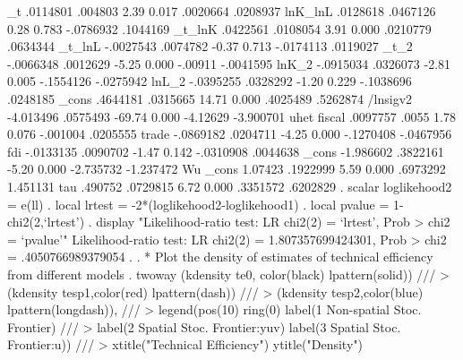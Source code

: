           _t {\VBAR}   .0114801    .004803     2.39   0.017     .0020664    .0208937
     lnK_lnL {\VBAR}   .0128618   .0467126     0.28   0.783    -.0786932    .1044169
      _t_lnK {\VBAR}   .0422561   .0108054     3.91   0.000     .0210779    .0634344
      _t_lnL {\VBAR}  -.0027543   .0074782    -0.37   0.713    -.0174113    .0119027
        _t_2 {\VBAR}  -.0066348   .0012629    -5.25   0.000      -.00911   -.0041595
       lnK_2 {\VBAR}  -.0915034   .0326073    -2.81   0.005    -.1554126   -.0275942
       lnL_2 {\VBAR}  -.0395255   .0328292    -1.20   0.229    -.1038696    .0248185
       _cons {\VBAR}   .4644181   .0315665    14.71   0.000     .4025489    .5262874
    /lnsigv2 {\VBAR}  -4.013496   .0575493   -69.74   0.000     -4.12629   -3.900701
uhet         {\VBAR}
      fiscal {\VBAR}   .0097757      .0055     1.78   0.076     -.001004    .0205555
       trade {\VBAR}  -.0869182   .0204711    -4.25   0.000    -.1270408   -.0467956
         fdi {\VBAR}  -.0133135   .0090702    -1.47   0.142    -.0310908    .0044638
       _cons {\VBAR}  -1.986602   .3822161    -5.20   0.000    -2.735732   -1.237472
Wu           {\VBAR}
       _cons {\VBAR}    1.07423   .1922999     5.59   0.000     .6973292    1.451131
         tau {\VBAR}    .490752   .0729815     6.72   0.000     .3351572    .6202829
{\smallskip}
. scalar loglikehood2 =  e(ll)
{\smallskip}
. local lrtest = -2*(loglikehood2-loglikehood1)
{\smallskip}
. local pvalue = 1- chi2(2,`lrtest')
{\smallskip}
. display "Likelihood-ratio test: LR chi2(2) = `lrtest', Prob > chi2 = `pvalue'"
Likelihood-ratio test: LR chi2(2) = 1.807357699424301, Prob > chi2 = .4050766989379054
{\smallskip}
. 
. * Plot the density of estimates of technical efficiency from different models
. twoway (kdensity te0, color(black) lpattern(solid)) ///
>        (kdensity tesp1,color(red) lpattern(dash))   ///
>            (kdensity tesp2,color(blue) lpattern(longdash)),  ///
>         legend(pos(10) ring(0) label(1 Non-spatial Stoc. Frontier) ///
>         label(2 Spatial Stoc. Frontier:yuv) label(3 Spatial Stoc. Frontier:u)) ///
>         xtitle("Technical Efficiency") ytitle("Density")
{\smallskip}
